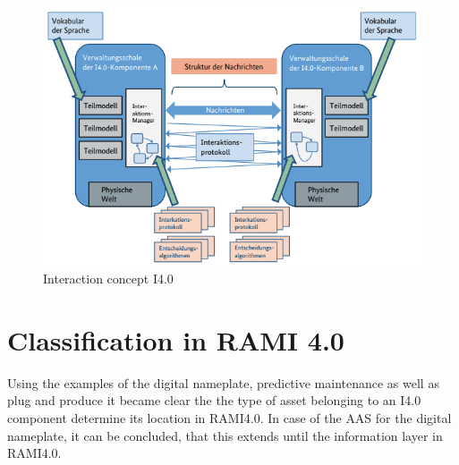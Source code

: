 \begin{figure}[h]
\centering
\includegraphics[scale=0.7]{content/pictures/interaction_i40_components.png}
\caption{Interaction concept \ac{I4.0}}
\label{fig:interaction-concept-i40}
\end{figure}

\section{Classification in RAMI 4.0}

Using the examples of the digital nameplate, predictive maintenance as well as plug and produce it became clear the the type of asset belonging to an \ac{I4.0} component determine its location in \ac{RAMI4.0}. In case of the \ac{AAS} for the digital nameplate, it can be concluded, that this extends until the information layer in \ac{RAMI4.0}. 


